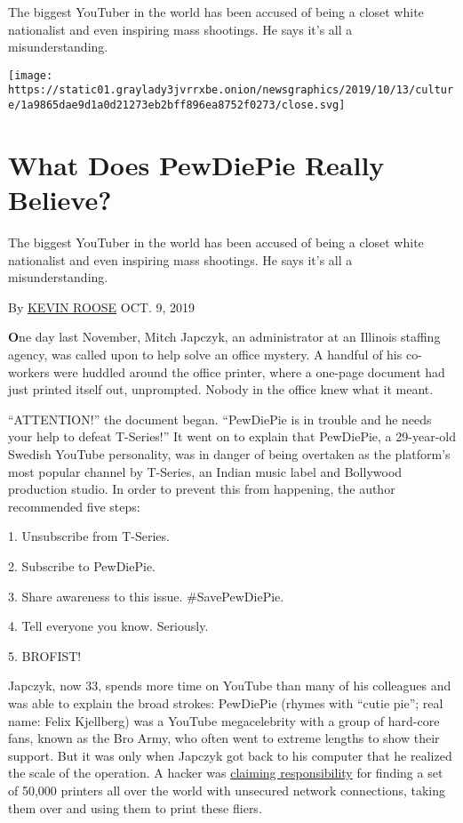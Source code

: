 The biggest YouTuber in the world has been accused of being a closet
white nationalist and even inspiring mass shootings. He says it's all a
misunderstanding.

\texttt{[image: https://static01.graylady3jvrrxbe.onion/newsgraphics/2019/10/13/culture/1a9865dae9d1a0d21273eb2bff896ea8752f0273/close.svg]}

\hypertarget{what-does-pewdiepie-really-believe-1}{%
\section{What Does PewDiePie Really
Believe?}\label{what-does-pewdiepie-really-believe-1}}

The biggest YouTuber in the world has been accused of being a closet
white nationalist and even inspiring mass shootings. He says it's all a
misunderstanding.

By \href{https://www.nytimes3xbfgragh.onion/by/kevin-roose}{KEVIN ROOSE}
OCT. 9, 2019

\textbf{O}ne day last November, Mitch Japczyk, an administrator at an
Illinois staffing agency, was called upon to help solve an office
mystery. A handful of his co-workers were huddled around the office
printer, where a one-page document had just printed itself out,
unprompted. Nobody in the office knew what it meant.

``ATTENTION!'' the document began. ``PewDiePie is in trouble and he
needs your help to defeat T-Series!'' It went on to explain that
PewDiePie, a 29-year-old Swedish YouTube personality, was in danger of
being overtaken as the platform's most popular channel by T-Series, an
Indian music label and Bollywood production studio. In order to prevent
this from happening, the author recommended five steps:

1. Unsubscribe from T-Series.

2. Subscribe to PewDiePie.

3. Share awareness to this issue. \#SavePewDiePie.

4. Tell everyone you know. Seriously.

5. BROFIST!

Japczyk, now 33, spends more time on YouTube than many of his colleagues
and was able to explain the broad strokes: PewDiePie (rhymes with
``cutie pie''; real name: Felix Kjellberg) was a YouTube megacelebrity
with a group of hard-core fans, known as the Bro Army, who often went to
extreme lengths to show their support. But it was only when Japczyk got
back to his computer that he realized the scale of the operation. A
hacker was
\href{https://www.theverge.com/2018/11/30/18119576/pewdiepie-printer-hack-t-series-youtube}{claiming
responsibility} for finding a set of 50,000 printers all over the world
with unsecured network connections, taking them over and using them to
print these fliers.


